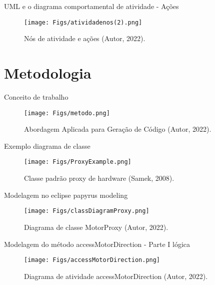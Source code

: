 \documentclass[handout,aspectratio = 169]{beamer}
\begin{document}
\begin{frame}{UML e o diagrama comportamental de atividade - Ações}
    \begin{figure}
            \centering
             \texttt{[image: Figs/atividadenos(2).png]}
            \caption{Nós de atividade e ações (Autor, 2022).}
    \end{figure}
\end{frame}

\section{Metodologia}
\begin{frame}{Conceito de trabalho}
    \begin{figure}
            \centering
             \texttt{[image: Figs/metodo.png]}
            \caption{Abordagem Aplicada para Geração de Código (Autor, 2022).}
        \end{figure}
\end{frame}

\begin{frame}{Exemplo diagrama de classe}
    \begin{figure}
            \centering
             \texttt{[image: Figs/ProxyExample.png]}
            \caption{Classe padrão proxy de hardware (Samek, 2008).}
        \end{figure}
\end{frame}

\begin{frame}{Modelagem no eclipse papyrus modeling}
    \begin{figure}
            \centering
             \texttt{[image: Figs/classDiagramProxy.png]}
            \caption{Diagrama de classe MotorProxy (Autor, 2022).}
        \end{figure}
\end{frame}

\begin{frame}{Modelagem do método accessMotorDirection - Parte I lógica}
    \begin{figure}
            \centering
             \texttt{[image: Figs/accessMotorDirection.png]}
            \caption{Diagrama de atividade accessMotorDirection (Autor, 2022).}
        \end{figure}
\end{frame}
\end{document}
